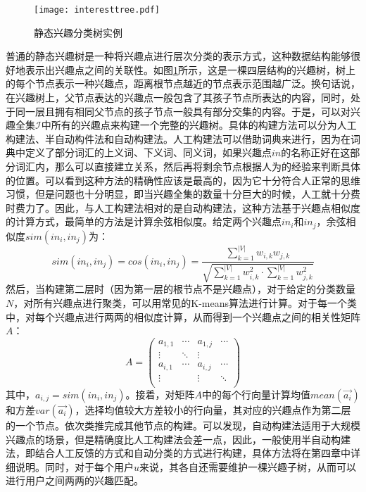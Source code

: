 \begin{figure}
\centering
\texttt{[image: interesttree.pdf]}
\caption{静态兴趣分类树实例}
\label{fig:interesttree}
\end{figure}

普通的静态兴趣树是一种将兴趣点进行层次分类的表示方式，这种数据结构能够很好地表示出兴趣点之间的关联性。如图\ref{fig:interesttree}所示，这是一棵四层结构的兴趣树，树上的每个节点表示一种兴趣点，距离根节点越近的节点表示范围越广泛。换句话说，在兴趣树上，父节点表达的兴趣点一般包含了其孩子节点所表达的内容，同时，处于同一层且拥有相同父节点的孩子节点一般具有部分交集的内容。于是，可以对兴趣全集$\mathcal{I}$中所有的兴趣点来构建一个完整的兴趣树。具体的构建方法可以分为人工构建法、半自动构件法和自动构建法。人工构建法可以借助词典来进行，因为在词典中定义了部分词汇的上义词、下义词、同义词，如果兴趣点$in$的名称正好在这部分词汇内，那么可以直接建立关系，然后再将剩余节点根据人为的经验来判断具体的位置。可以看到这种方法的精确性应该是最高的，因为它十分符合人正常的思维习惯，但是问题也十分明显，即当兴趣全集的数量十分巨大的时候，人工就十分费时费力了。因此，与人工构建法相对的是自动构建法，这种方法基于兴趣点相似度的计算方式，最简单的方法是计算余弦相似度。给定两个兴趣点$in_i$和$in_j$，余弦相似度$sim(in_i,in_j)$为：
\begin{equation}
  sim(in_i,in_j)=cos(in_i,in_j)=\frac{\sum_{k=1}^{|V|}w_{i,k}w_{j,k}}{\sqrt{\sum_{k=1}^{|V|}w_{i,k}^{2}\cdot\sum_{k=1}^{|V|}w_{j,k}^{2}}}
\end{equation}
然后，当构建第二层时（因为第一层的根节点不是兴趣点），对于给定的分类数量$N$，对所有兴趣点进行聚类，可以用常见的K-means算法进行计算。对于每一个类中，对每个兴趣点进行两两的相似度计算，从而得到一个兴趣点之间的相关性矩阵$A$：
\begin{equation*}
  A=\left(
  \begin{array}{cccc}
    a_{1,1} & \cdots & a_{1,j} & \cdots \\
    \vdots & \ddots & \vdots & \\
    a_{i,1} & \cdots & a_{i,j} & \cdots \\
    \vdots & & \vdots & \ddots \\ 
  \end{array}
  \right)
\end{equation*}
其中，$a_{i,j}=sim(in_i,in_j)$。接着，对矩阵$A$中的每个行向量计算均值$mean(\vec{a_i})$和方差$var(\vec{a_i})$，选择均值较大方差较小的行向量，其对应的兴趣点作为第二层的一个节点。依次类推完成其他节点的构建。可以发现，自动构建法适用于大规模兴趣点的场景，但是精确度比人工构建法会差一点，因此，一般使用半自动构建法，即结合人工反馈的方式和自动分类的方式进行构建，具体方法将在第四章中详细说明。同时，对于每个用户$u$来说，其各自还需要维护一棵兴趣子树，从而可以进行用户之间两两的兴趣匹配。

